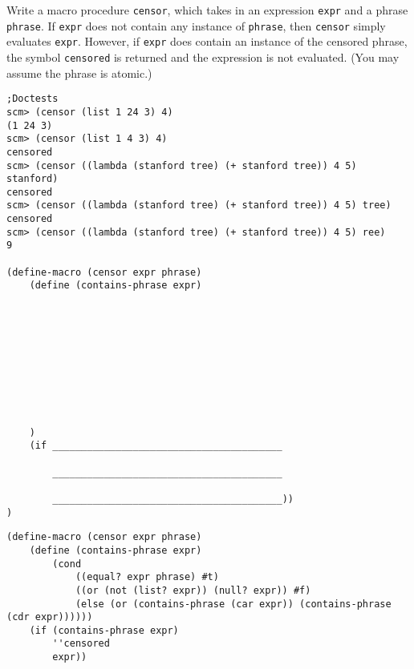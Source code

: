 \begin{blocksection}
\question Write a macro procedure \lstinline{censor}, which takes in an expression \lstinline{expr} and a phrase \lstinline{phrase}. If \lstinline{expr} does not contain any instance of \lstinline{phrase}, then \lstinline{censor} simply evaluates \lstinline{expr}. However, if \lstinline{expr} does contain an instance of the censored phrase, the symbol \lstinline{censored} is returned and the expression is not evaluated. (You may assume the phrase is atomic.)

\begin{lstlisting}
;Doctests
scm> (censor (list 1 24 3) 4)
(1 24 3)
scm> (censor (list 1 4 3) 4)
censored
scm> (censor ((lambda (stanford tree) (+ stanford tree)) 4 5) stanford)
censored
scm> (censor ((lambda (stanford tree) (+ stanford tree)) 4 5) tree)
censored
scm> (censor ((lambda (stanford tree) (+ stanford tree)) 4 5) ree)
9

(define-macro (censor expr phrase)
    (define (contains-phrase expr)
    
    
    
    
    




    
    )
    (if ________________________________________

        ________________________________________

        ________________________________________))
)
\end{lstlisting}

\begin{solution}
\begin{lstlisting}
(define-macro (censor expr phrase)
    (define (contains-phrase expr)
        (cond 
            ((equal? expr phrase) #t)
            ((or (not (list? expr)) (null? expr)) #f)
            (else (or (contains-phrase (car expr)) (contains-phrase (cdr expr))))))
    (if (contains-phrase expr)
        ''censored
        expr))
\end{lstlisting}
\end{solution}
\end{blocksection}